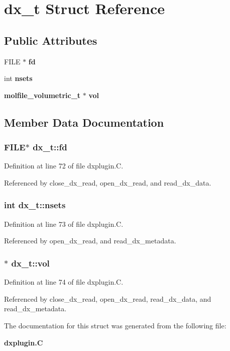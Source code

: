 \section{dx\_\-t  Struct Reference}
\label{structdx__t}
\subsection*{Public Attributes}
\begin{CompactItemize}
\item 
FILE $\ast$ {\bf fd}
\item 
int {\bf nsets}
\item 
{\bf molfile\_\-volumetric\_\-t} $\ast$ {\bf vol}
\end{CompactItemize}


\subsection{Member Data Documentation}
\subsubsection{\setlength{\rightskip}{0pt plus 5cm}FILE$\ast$ dx\_\-t::fd}\label{structdx__t_m0}




Definition at line 72 of file dxplugin.C.

Referenced by close\_\-dx\_\-read, open\_\-dx\_\-read, and read\_\-dx\_\-data.
\subsubsection{\setlength{\rightskip}{0pt plus 5cm}int dx\_\-t::nsets}\label{structdx__t_m1}




Definition at line 73 of file dxplugin.C.

Referenced by open\_\-dx\_\-read, and read\_\-dx\_\-metadata.
\subsubsection{$\ast$ dx\_\-t::vol}\label{structdx__t_m2}




Definition at line 74 of file dxplugin.C.

Referenced by close\_\-dx\_\-read, open\_\-dx\_\-read, read\_\-dx\_\-data, and read\_\-dx\_\-metadata.

The documentation for this struct was generated from the following file:\begin{CompactItemize}
\item 
{\bf dxplugin.C}\end{CompactItemize}
